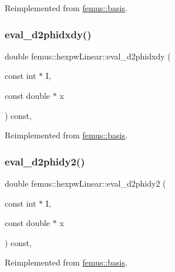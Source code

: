Reimplemented from \mbox{\hyperlink{classfemus_1_1basis_a0a9839e75d1c9c8302486fc072eed028}{femus\+::basis}}.

\mbox{\label{classfemus_1_1hexpw_linear_ac0018245cf34cd4fc79de13e42b32817}} 
\subsubsection{\texorpdfstring{eval\+\_\+d2phidxdy()}{eval\_d2phidxdy()}}
{\footnotesize\ttfamily double femus\+::hexpw\+Linear\+::eval\+\_\+d2phidxdy (\begin{DoxyParamCaption}\item[{const int $\ast$}]{I,  }\item[{const double $\ast$}]{x }\end{DoxyParamCaption}) const\hspace{0.3cm}{\ttfamily [inline]}, {\ttfamily [virtual]}}



Reimplemented from \mbox{\hyperlink{classfemus_1_1basis_ac9feaf9e60421143db2a3708f3c7fa48}{femus\+::basis}}.

\mbox{\label{classfemus_1_1hexpw_linear_ab01049b3e87767f0f4b04a9cec8efa77}} 
\subsubsection{\texorpdfstring{eval\+\_\+d2phidy2()}{eval\_d2phidy2()}}
{\footnotesize\ttfamily double femus\+::hexpw\+Linear\+::eval\+\_\+d2phidy2 (\begin{DoxyParamCaption}\item[{const int $\ast$}]{I,  }\item[{const double $\ast$}]{x }\end{DoxyParamCaption}) const\hspace{0.3cm}{\ttfamily [inline]}, {\ttfamily [virtual]}}



Reimplemented from \mbox{\hyperlink{classfemus_1_1basis_a0febb29fe4b32213ff8d6d428f7241cd}{femus\+::basis}}.

